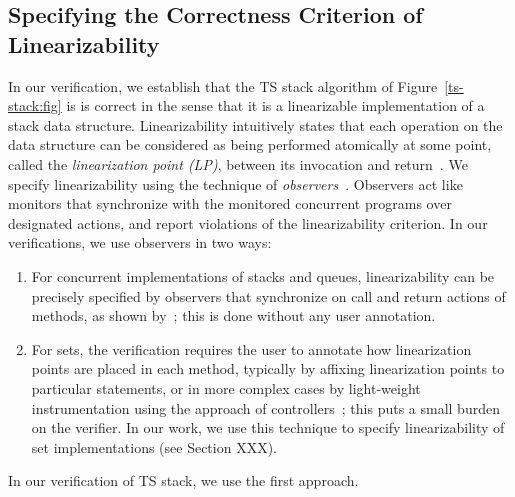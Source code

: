 \subsection{Specifying the Correctness Criterion of Linearizability}
In our verification, we establish that the TS stack algorithm of
Figure~\ref{ts-stack:fig} is is correct in the sense that it is a
linearizable implementation of a stack data structure.
Linearizability intuitively states that
each operation on the data structure can be considered as being
performed atomically at some point, called the {\em linearization point (LP)},
between its invocation and return~\cite{HeWi:linearizability}.
We specify linearizability using the technique of
{\em observers}~\cite{AHHR:integrated}. Observers act like monitors that
synchronize with the monitored concurrent programs over designated actions,
and report violations of the linearizability criterion. In our verifications,
we use observers in two ways:
\begin{enumerate}
\item
  For concurrent implementations of stacks and queues,
  linearizability can be precisely specified by
  observers that synchronize on call and return actions of
  methods, as shown by~\cite{BEEH:icalp15,HSV:concur13}; this is done without
 any user annotation.
\item
  For sets, the verification requires the user to annotate how linearization
  points are placed in each method, typically by affixing
  linearization points to particular statements, or in more complex cases by
  light-weight instrumentation using the approach of
  controllers~\cite{Quy:sas16}; this puts a small burden on
  the verifier.
In our work, we use this technique to specify linearizability of
set implementations (see Section XXX).
\end{enumerate}
In our verification of TS stack, we use the first approach. 


